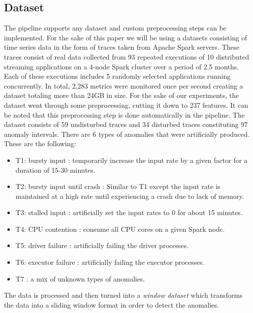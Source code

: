 \documentclass[oneside, a4paper, onecolumn, 11pt]{article}
\begin{document}
\subsection{Dataset}
The pipeline supports any dataset and custom preprocessing steps can be implemented. For the sake of this paper we will be using a datasets consisting of time series data in the form of traces taken from Apache Spark servers. These traces consist of real data collected from 93 repeated executions of 10 distributed streaming applications on a 4-node Spark cluster over a period of 2.5 months. Each of these executions includes 5 randomly selected applications running concurrently. In total, 2,283 metrics were monitored once per second creating a dataset totaling more than 24GB in size. For the sake of our experiments, the dataset went through some preprocessing, cutting it down to 237 features. It can be noted that this preprocessing step is done automatically in the pipeline.
The dataset consists of 59 undisturbed traces and 34 disturbed traces constituting 97 anomaly intervals. There are 6 types of anomalies that were artificially produced. These are the following: 
\begin{itemize}
    \item T1: bursty input : temporarily increase the input rate by a given factor for a duration of 15-30 minutes.
    \item T2: bursty input until crash : Similar to T1 except the input rate is maintained at a high rate until experiencing a crash due to lack of memory.
    \item T3: stalled input : artificially set the input rates to 0 for about 15 minutes.
    \item T4: CPU contention : consume all CPU cores on a given Spark
    node.
    \item T5: driver failure : artificially failing the driver processes.
    \item T6: executor failure : artificially failing the executor processes.
    \item T7 : a mix of unknown types of anomalies.
\end{itemize}
The data is processed and then turned into a \textit{window dataset} which transforms the data into a sliding window format in order to detect the anomalies.
\end{document}
